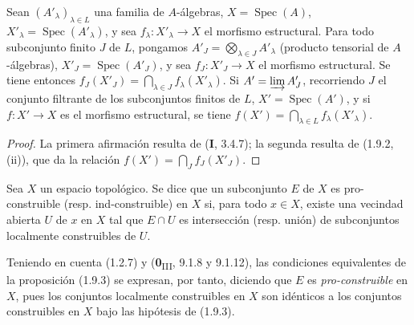 \begin{lemma}[1.9.3.2]
\label{IV.1.9.3.2-fr}
Sean $(A'_\lambda)_{\lambda\in L}$ una familia de $A$-álgebras,
$X=\operatorname{Spec}(A)$, $X'_\lambda=\operatorname{Spec}(A'_\lambda)$,
y sea $f_\lambda:X'_\lambda\to X$ el morfismo estructural. Para todo
subconjunto finito $J$ de $L$, pongamos
$A'_J=\bigotimes_{\lambda\in J}A'_\lambda$ (producto tensorial de
$A$-álgebras), $X'_J=\operatorname{Spec}(A'_J)$, y sea $f_J:X'_J\to X$ el
morfismo estructural. Se tiene entonces
$f_J(X'_J)=\bigcap_{\lambda\in J}f_\lambda(X'_\lambda)$. Si
$A'=\varinjlim A'_J$, recorriendo $J$ el conjunto filtrante de los subconjuntos finitos
de $L$, $X'=\operatorname{Spec}(A')$, y si $f:X'\to X$ es el morfismo
estructural, se tiene $f(X')=\bigcap_{\lambda\in L}f_\lambda(X'_\lambda)$.
\end{lemma}

\begin{proof}
La primera afirmación resulta de (\textbf{I}, 3.4.7); la segunda resulta de (1.9.2,
(ii)), que da la relación $f(X')=\bigcap_Jf_J(X'_J)$.
\end{proof}

\begin{definition}[1.9.4]
\label{IV.1.9.4-fr}
Sea $X$ un espacio topológico. Se dice que un subconjunto $E$ de $X$ es
pro-construible \textup{(resp.} ind-construible\textup{)} en $X$ si, para
todo $x\in X$, existe una vecindad abierta $U$ de $x$ en $X$ tal que
$E\cap U$ es intersección \textup{(resp.} unión\textup{)} de subconjuntos localmente
construibles de $U$.
\end{definition}

Teniendo en cuenta (1.2.7) y (\textbf{0}\textsubscript{III}, 9.1.8 y 9.1.12), las
condiciones equivalentes de la proposición (1.9.3) se expresan, por tanto, diciendo
que $E$ es \emph{pro-construible} en $X$, pues los conjuntos localmente
construibles en $X$ son idénticos a los conjuntos construibles en
$X$ bajo las hipótesis de (1.9.3).


